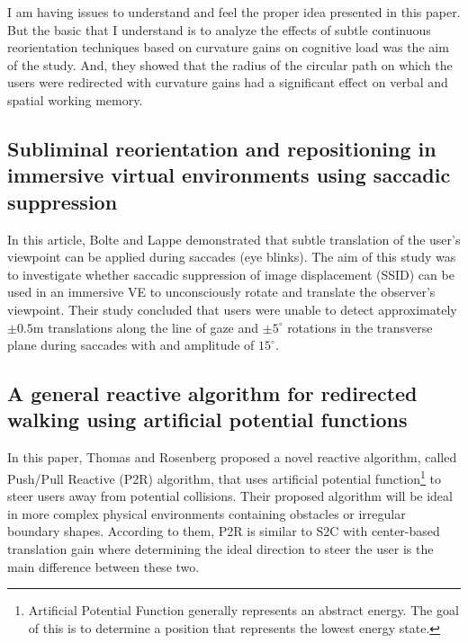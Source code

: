 \documentclass[12pt]{article}
\begin{document}
I am having issues to understand and feel the proper idea presented in this paper. But the basic that I understand is to analyze the effects of subtle continuous reorientation techniques based on curvature gains on cognitive load was the aim of the study. And, they showed that the radius of the circular path on which the users were redirected with curvature gains had a significant effect on verbal and spatial working memory.

\subsection{Subliminal reorientation and repositioning in immersive virtual environments using saccadic suppression}
\textbf{\cite{bolte2015subliminal}}

In this article, Bolte and Lappe demonstrated that subtle translation of the user's viewpoint can be applied during saccades (eye blinks). The aim of this study was to investigate whether saccadic suppression of image displacement (SSID) can be used in an immersive VE to unconsciously rotate and translate the observer's viewpoint. Their study concluded that users were unable to detect approximately $\pm 0.5$m translations along the line of gaze and $\pm 5^{\circ}$ rotations in the transverse plane during saccades with and amplitude of $15^{\circ}$.

\subsection{A general reactive algorithm for redirected walking using artificial potential functions}
\textbf{\cite{thomas2019general}}

\def \fnoteGrad {Gradient is a synonym of \emph{derivative} which indicates the rate of change of a function. This vector points in the direction of greatest increase of a function. Formally, the gradient of a scalar function $f$ is defined as the unique vector field whose dot product with any vector $v$ at each point $x$ is the directional derivative of $f$ along $v$. That is, $(\nabla f(x)) \cdot v = D_vf(x)$}

In this paper, Thomas and Rosenberg proposed a novel reactive algorithm, called Push/Pull Reactive (P2R) algorithm, that uses artificial potential function\footnote{Artificial Potential Function generally represents an abstract energy. The goal of this is to determine a position that represents the lowest energy state.} to steer users away from potential collisions. Their proposed algorithm will be ideal in more complex physical environments containing obstacles or irregular boundary shapes. According to them, P2R is similar to S2C with center-based translation gain where determining the ideal direction to steer the user is the main difference between these two.
\end{document}
